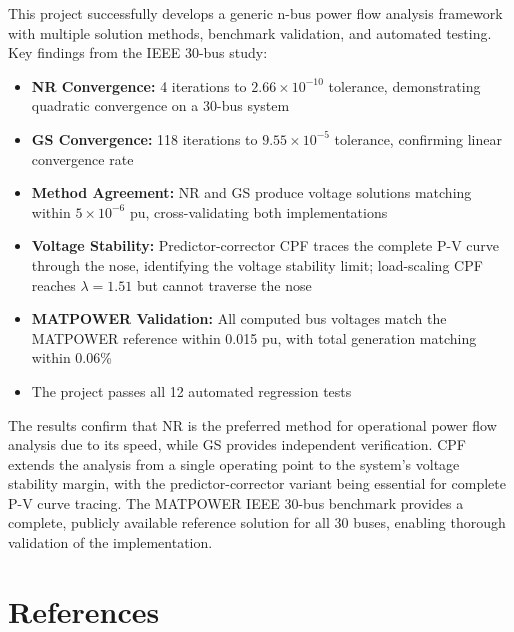 \documentclass[12pt,a4paper]{article}
\begin{document}
This project successfully develops a generic n-bus power flow analysis framework with multiple solution methods, benchmark validation, and automated testing. Key findings from the IEEE 30-bus study:

\begin{itemize}
    \item \textbf{NR Convergence:} 4 iterations to $2.66\times10^{-10}$ tolerance, demonstrating quadratic convergence on a 30-bus system
    \item \textbf{GS Convergence:} 118 iterations to $9.55\times10^{-5}$ tolerance, confirming linear convergence rate
    \item \textbf{Method Agreement:} NR and GS produce voltage solutions matching within $5\times10^{-6}$ pu, cross-validating both implementations
    \item \textbf{Voltage Stability:} Predictor-corrector CPF traces the complete P-V curve through the nose, identifying the voltage stability limit; load-scaling CPF reaches $\lambda = 1.51$ but cannot traverse the nose
    \item \textbf{MATPOWER Validation:} All computed bus voltages match the MATPOWER reference within 0.015 pu, with total generation matching within 0.06\%
    \item The project passes all 12 automated regression tests
\end{itemize}

The results confirm that NR is the preferred method for operational power flow analysis due to its speed, while GS provides independent verification. CPF extends the analysis from a single operating point to the system's voltage stability margin, with the predictor-corrector variant being essential for complete P-V curve tracing. The MATPOWER IEEE 30-bus benchmark provides a complete, publicly available reference solution for all 30 buses, enabling thorough validation of the implementation.

\section{References}
\end{document}
